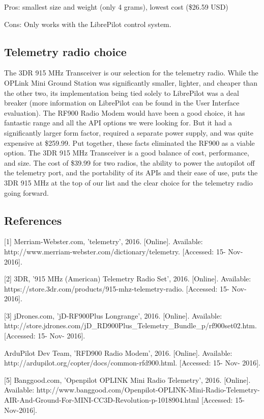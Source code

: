 \documentclass[compsoc,draftclsnofoot,onecolumn,10pt]{IEEEtran}
\begin{document}
Pros: smallest size and weight (only 4 grams), lowest cost (\$26.59 USD)

Cons: Only works with the LibrePilot control system.


\subsection{Telemetry radio choice}
The 3DR 915 MHz Transceiver is our selection for the telemetry radio.
While the OPLink Mini Ground Station was significantly smaller, lighter, and
cheaper than the other two, its implementation being tied solely to LibrePilot
was a deal breaker (more information on LibrePilot can be found in the User
Interface evaluation).
The RF900 Radio Modem would have been a good choice, it has fantastic range
and all the API options we were looking for. But it had a significantly larger
form factor, required a separate power supply, and was quite expensive at
\$259.99. Put together, these facts eliminated the RF900 as a viable option.
The 3DR 915 MHz Transceiver is a good balance of cost, performance, and size. The
cost of \$39.99 for two radios, the ability to power the autopilot off the
telemetry port, and the portability of its APIs and their ease of use, puts the
3DR 915 MHz at the top of our list and the clear choice for the telemetry
radio going forward.

\subsection{References}

[1] Merriam-Webster.com, 'telemetry', 2016. [Online]. Available: http://www.merriam-webster.com/dictionary/telemetry. [Accessed: 15- Nov- 2016].\par

[2] 3DR, '915 MHz (American) Telemetry Radio Set', 2016. [Online]. Available: https://store.3dr.com/products/915-mhz-telemetry-radio. [Accessed: 15- Nov- 2016].\par

[3] jDrones.com, 'jD-RF900Plus Longrange', 2016. [Online]. Available: http://store.jdrones.com/jD\_RD900Plus\_Telemetry\_Bundle\_p/rf900set02.htm. [Accessed: 15- Nov- 2016].\par
[4] ArduPilot Dev Team, 'RFD900 Radio Modem', 2016. [Online]. Available: http://ardupilot.org/copter/docs/common-rfd900.html. [Accessed: 15- Nov- 2016].\par

[5] Banggood.com, 'Openpilot OPLINK Mini Radio Telemetry', 2016. [Online].
Available: http://www.banggood.com/Openpilot-OPLINK-Mini-Radio-Telemetry-AIR-And-Ground-For-MINI-CC3D-Revolution-p-1018904.html [Accessed: 15- Nov-2016].\par
\end{document}
